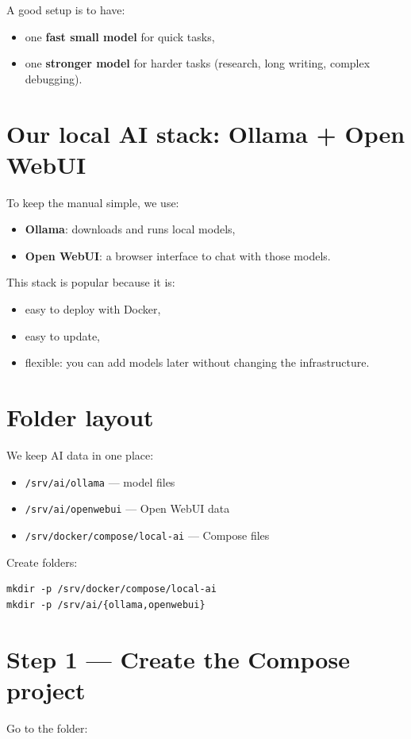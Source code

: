 A good setup is to have:
\begin{itemize}[leftmargin=*]
  \item one \textbf{fast small model} for quick tasks,
  \item one \textbf{stronger model} for harder tasks (research, long writing, complex debugging).
\end{itemize}

\section{Our local AI stack: Ollama + Open WebUI}
To keep the manual simple, we use:
\begin{itemize}[leftmargin=*]
  \item \textbf{Ollama}: downloads and runs local models,
  \item \textbf{Open WebUI}: a browser interface to chat with those models.
\end{itemize}

This stack is popular because it is:
\begin{itemize}[leftmargin=*]
  \item easy to deploy with Docker,
  \item easy to update,
  \item flexible: you can add models later without changing the infrastructure.
\end{itemize}

\section{Folder layout}
We keep AI data in one place:

\begin{itemize}[leftmargin=*]
  \item \texttt{/srv/ai/ollama} --- model files
  \item \texttt{/srv/ai/openwebui} --- Open WebUI data
  \item \texttt{/srv/docker/compose/local-ai} --- Compose files
\end{itemize}

Create folders:

\begin{lstlisting}
mkdir -p /srv/docker/compose/local-ai
mkdir -p /srv/ai/{ollama,openwebui}
\end{lstlisting}

\section{Step 1 --- Create the Compose project}
Go to the folder:

